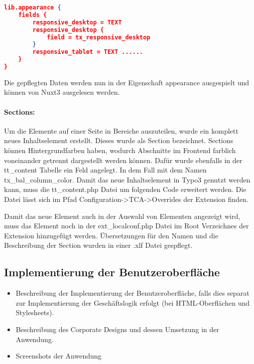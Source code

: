 \begin{lstlisting}[language=json,firstnumber=1]
lib.appearance {
    fields {
        responsive_desktop = TEXT
        responsive_desktop {
            field = tx_responsive_desktop
        }
        responsive_tablet = TEXT ......
    }
}
\end{lstlisting}

Die gepflegten Daten werden nun in der Eigenschaft appearance ausgespielt und können von Nuxt3 ausgelesen werden.

\paragraph{Sections:}
Um die Elemente auf einer Seite in Bereiche auszuteilen, wurde ein komplett neues Inhaltselement erstellt. Dieses wurde als Section bezeichnet. Sections können Hintergrundfarben haben, wodurch Abschnitte im Frontend farblich voneinander getrennt dargestellt werden können. Dafür wurde ebenfalls in der tt\_content Tabelle ein Feld angelegt. In dem Fall mit dem Namen tx\_bal\_column\_color. Damit das neue Inhaltselement in Typo3 genutzt werden kann, muss die tt\_content.php Datei um folgenden Code erweitert werden.  \newline Die Datei lässt sich im Pfad Configuration->TCA->Overrides der Extension finden.

Damit das neue Element auch in der Auswahl von Elementen angezeigt wird, muss das Element noch in der ext\_localconf.php Datei im Root Verzeichnes der Extension hinzugefügt werden.\newline {} \newline Übersetzungen für den Namen und die Beschreibung der Section wurden in einer .xlf Datei gespflegt.


\subsection{Implementierung der Benutzeroberfläche}
\label{sec:ImplementierungBenutzeroberflaeche}

\begin{itemize}
	\item Beschreibung der Implementierung der Benutzeroberfläche, falls dies separat zur Implementierung der Geschäftslogik erfolgt (\zB bei \acs{HTML}-Oberflächen und Stylesheets).
	\item \Ggfs Beschreibung des Corporate Designs und dessen Umsetzung in der Anwendung.
	\item Screenshots der Anwendung
\end{itemize}
